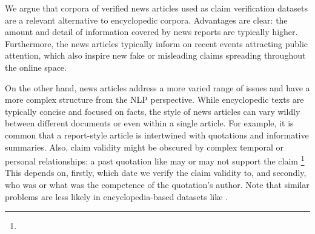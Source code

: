 We argue that corpora of verified news articles used as claim verification datasets are a relevant alternative to encyclopedic corpora.
Advantages are clear: the amount and detail of information covered by news reports are typically higher.
Furthermore, the news articles typically inform on recent events attracting public attention, which also inspire new fake or misleading claims spreading throughout the online space.

On the other hand, news articles address a more varied range of issues and have a more complex structure from the NLP perspective.
While encyclopedic texts are typically concise and focused on facts, the style of news articles can vary wildly between different documents or even within a single article.
For example, it is common that a report-style article is intertwined with quotations and informative summaries.
Also, claim validity might be obscured by complex temporal or personal relationships: a past quotation like  may or may not support the claim \footnote{}
This depends on, firstly, which date we verify the claim validity to, and secondly, who was or what was the competence of the quotation's author.
Note that similar problems are less likely in encyclopedia-based datasets like \FEVER\cite{fever2018}.


